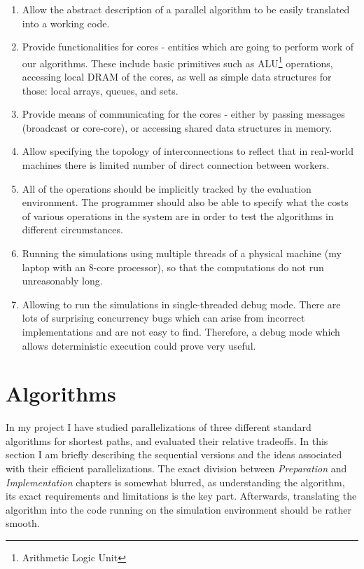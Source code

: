 \documentclass[12pt,a4paper,twoside,openright]{report}
\begin{document}
\begin{enumerate}
    \item Allow the abstract description of a parallel algorithm to be easily translated into a working code.
    \item Provide functionalities for cores - entities which are going to perform work of our algorithms. These include basic primitives such as ALU\footnote{Arithmetic Logic Unit} operations, accessing local DRAM of the cores, as well as simple data structures for those: local arrays, queues, and sets. 
    \item Provide means of communicating for the cores - either by passing messages (broadcast or core-core), or accessing shared data structures in memory.
    \item Allow specifying the topology of interconnections to reflect that in real-world machines there is limited number of direct connection between workers.
    \item All of the operations should be implicitly tracked by the evaluation environment. The programmer should also be able to specify what the costs of various operations in the system are in order to test the algorithms in different circumstances.
    \item Running the simulations using multiple threads of a physical machine (my laptop with an $8$-core processor), so that the computations do not run unreasonably long.
    \item Allowing to run the simulations in single-threaded debug mode. There are lots of surprising concurrency bugs which can arise from incorrect implementations and are not easy to find. Therefore, a debug mode which allows deterministic execution could prove very useful.
\end{enumerate}

\section{Algorithms}
In my project I have studied parallelizations of three different standard algorithms for shortest paths, and evaluated their relative tradeoffs. In this section I am briefly describing the sequential versions and the ideas associated with their efficient parallelizations. The exact division between \textit{Preparation} and \textit{Implementation} chapters is somewhat blurred, as understanding the algorithm, its exact requirements and limitations is the key part. Afterwards, translating the algorithm into the code running on the simulation environment should be rather smooth.
\end{document}
